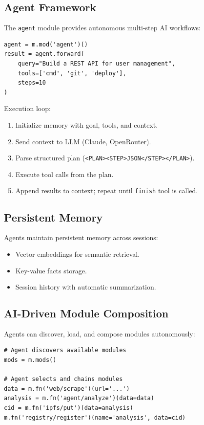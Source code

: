 \documentclass[11pt,a4paper]{article}
\begin{document}
\subsection{Agent Framework}

The \texttt{agent} module provides autonomous multi-step AI workflows:

\begin{lstlisting}[style=python]
agent = m.mod('agent')()
result = agent.forward(
    query="Build a REST API for user management",
    tools=['cmd', 'git', 'deploy'],
    steps=10
)
\end{lstlisting}

Execution loop:
\begin{enumerate}
    \item Initialize memory with goal, tools, and context.
    \item Send context to LLM (Claude, OpenRouter).
    \item Parse structured plan (\texttt{<PLAN><STEP>JSON</STEP></PLAN>}).
    \item Execute tool calls from the plan.
    \item Append results to context; repeat until \texttt{finish} tool is called.
\end{enumerate}

\subsection{Persistent Memory}

Agents maintain persistent memory across sessions:
\begin{itemize}
    \item Vector embeddings for semantic retrieval.
    \item Key-value facts storage.
    \item Session history with automatic summarization.
\end{itemize}

\subsection{AI-Driven Module Composition}

Agents can discover, load, and compose modules autonomously:

\begin{lstlisting}[style=python]
# Agent discovers available modules
mods = m.mods()

# Agent selects and chains modules
data = m.fn('web/scrape')(url='...')
analysis = m.fn('agent/analyze')(data=data)
cid = m.fn('ipfs/put')(data=analysis)
m.fn('registry/register')(name='analysis', data=cid)
\end{lstlisting}
\end{document}
